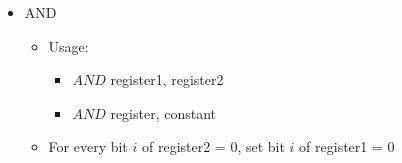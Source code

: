 \documentclass{article}
\begin{document}
\begin{itemize}
\begin{itemize}
\begin{itemize}
    \end{itemize}
    \item{AND}
    \begin{itemize}
      \item{Usage:}
      \begin{itemize}
        \item{$AND$ register1, register2}
        \item{$AND$ register, constant}
      \end{itemize}
      \item{For every bit $i$ of register2 = 0, set bit $i$ of register1 = 0}
    \end{itemize}
  \end{itemize}
\end{itemize}
\end{document}
